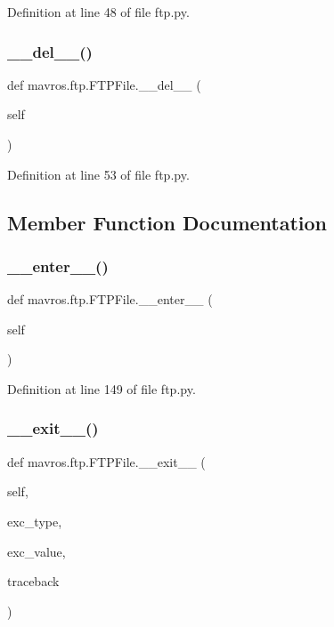 Definition at line 48 of file ftp.\+py.

\mbox{\label{classmavros_1_1ftp_1_1FTPFile_aa4c3a31a020d032afb6ab23d60bd6b52}} 
\subsubsection{\texorpdfstring{\_\_del\_\_()}{\_\_del\_\_()}}
{\footnotesize\ttfamily def mavros.\+ftp.\+F\+T\+P\+File.\+\_\+\+\_\+del\+\_\+\+\_\+ (\begin{DoxyParamCaption}\item[{}]{self }\end{DoxyParamCaption})}



Definition at line 53 of file ftp.\+py.



\subsection{Member Function Documentation}
\mbox{\label{classmavros_1_1ftp_1_1FTPFile_ab6e951ed4196f73fe9e56fd080cd2225}} 
\subsubsection{\texorpdfstring{\_\_enter\_\_()}{\_\_enter\_\_()}}
{\footnotesize\ttfamily def mavros.\+ftp.\+F\+T\+P\+File.\+\_\+\+\_\+enter\+\_\+\+\_\+ (\begin{DoxyParamCaption}\item[{}]{self }\end{DoxyParamCaption})}



Definition at line 149 of file ftp.\+py.

\mbox{\label{classmavros_1_1ftp_1_1FTPFile_a3455a85dc5cf2172788cda0687d91c0a}} 
\subsubsection{\texorpdfstring{\_\_exit\_\_()}{\_\_exit\_\_()}}
{\footnotesize\ttfamily def mavros.\+ftp.\+F\+T\+P\+File.\+\_\+\+\_\+exit\+\_\+\+\_\+ (\begin{DoxyParamCaption}\item[{}]{self,  }\item[{}]{exc\+\_\+type,  }\item[{}]{exc\+\_\+value,  }\item[{}]{traceback }\end{DoxyParamCaption})}



